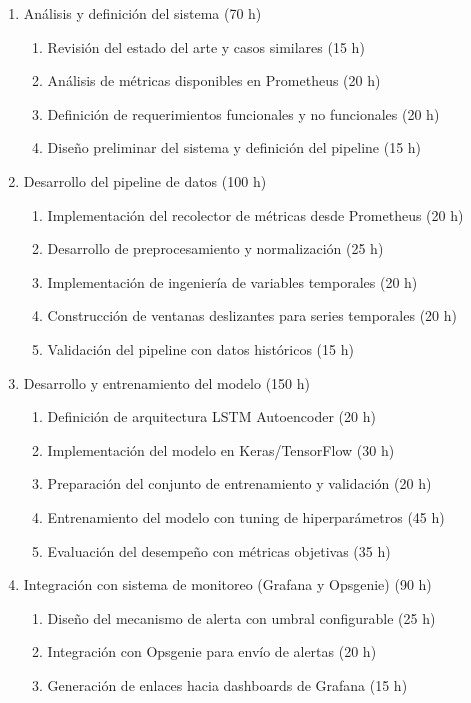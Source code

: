 \documentclass[
11pt, %
]{charter}
\begin{document}
\begin{enumerate}
\item Análisis y definición del sistema (70 h)
\begin{enumerate}
  \item Revisión del estado del arte y casos similares (15 h)
  \item Análisis de métricas disponibles en Prometheus (20 h)
  \item Definición de requerimientos funcionales y no funcionales (20 h)
  \item Diseño preliminar del sistema y definición del pipeline (15 h)
\end{enumerate}
\item Desarrollo del pipeline de datos (100 h)
\begin{enumerate}
  \item Implementación del recolector de métricas desde Prometheus (20 h)
  \item Desarrollo de preprocesamiento y normalización (25 h)
  \item Implementación de ingeniería de variables temporales (20 h)
  \item Construcción de ventanas deslizantes para series temporales (20 h)
  \item Validación del pipeline con datos históricos (15 h)
\end{enumerate}
\item Desarrollo y entrenamiento del modelo (150 h)
\begin{enumerate}
  \item Definición de arquitectura LSTM Autoencoder (20 h)
  \item Implementación del modelo en Keras/TensorFlow (30 h)
  \item Preparación del conjunto de entrenamiento y validación (20 h)
  \item Entrenamiento del modelo con tuning de hiperparámetros (45 h)
  \item Evaluación del desempeño con métricas objetivas (35 h)
\end{enumerate}
\item Integración con sistema de monitoreo (Grafana y Opsgenie) (90 h)
\begin{enumerate}
  \item Diseño del mecanismo de alerta con umbral configurable (25 h)
  \item Integración con Opsgenie para envío de alertas (20 h)
  \item Generación de enlaces hacia dashboards de Grafana (15 h)

\end{enumerate}
\end{enumerate}
\end{document}
